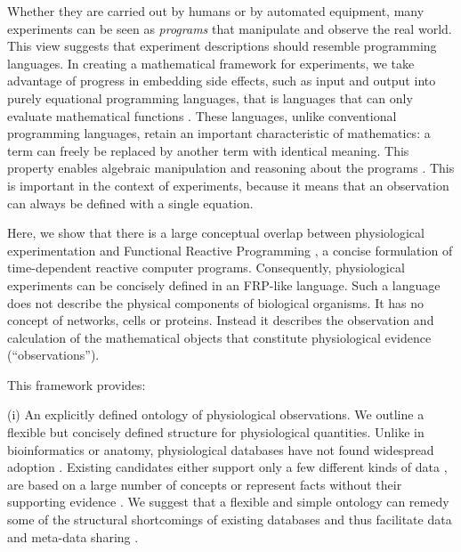 Whether they are carried out by humans or by automated equipment, many
experiments can be seen as \emph{programs} that manipulate and observe
the real world. This view suggests that experiment descriptions should
resemble programming languages. In creating a mathematical framework
for experiments, we take advantage of progress in embedding side
effects, such as input and output \citep{PeytonJones2002, Roy2004,
  Wadler1995} into purely equational programming languages, that is
languages that can only evaluate mathematical functions
\citep{Church1941}. These languages, unlike conventional programming
languages, retain an important characteristic of mathematics: a term
can freely be replaced by another term with identical meaning.
This property \citep[referential transparency;][]{Whitehead1927} enables
algebraic manipulation and reasoning about the programs
\citep{Bird1996}. This is important in the context of experiments,
because it means that an observation can always be defined with a
single equation.

Here, we show that there is a large conceptual overlap between
physiological experimentation and Functional Reactive Programming
\citep[FRP;][]{Elliott1997, Nilsson2002}, a concise formulation of
time-dependent reactive computer programs. Consequently, physiological
experiments can be concisely defined in an FRP-like language. Such a
language does not describe the physical components of biological
organisms. It has no concept of networks, cells or proteins. Instead
it describes the observation and calculation of the mathematical
objects that constitute physiological evidence (``observations'').

This framework provides:

(i) An explicitly defined ontology of physiological observations. We
outline a flexible but concisely defined structure for physiological
quantities.  Unlike in bioinformatics or anatomy, physiological
databases have not found widespread adoption \citep{Herz2008,
  Amari2002}. Existing candidates either support only a few different
kinds of data \citep{Teeters2008, Jessop2010}, are based on a large
number of concepts \citep{time ontology} or represent facts
without their supporting evidence \citep{Katz2010}.
We suggest that a flexible and simple ontology
can remedy some of the structural shortcomings of existing databases
\citep{Gardner2005, Amari2002} and thus facilitate data and meta-data
sharing \citep{Insel2003}.

